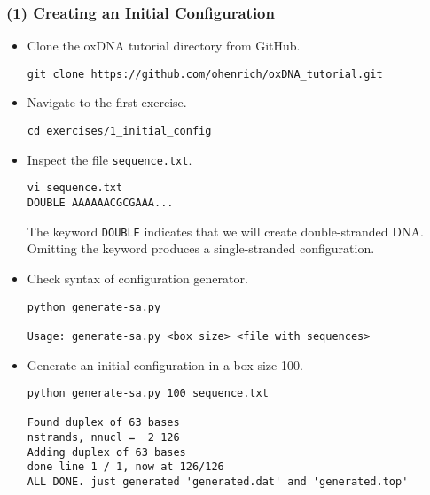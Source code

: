 \documentclass[slidestop,compress,9pt]{beamer}
\begin{document}
\begin{frame}[fragile]
\frametitle{(1) Creating an Initial Configuration}
\small

\begin{itemize}
\item Clone the oxDNA tutorial directory from GitHub.
\begin{lstlisting}
git clone https://github.com/ohenrich/oxDNA_tutorial.git 
\end{lstlisting}

\item Navigate to the first exercise.
\begin{lstlisting}
cd exercises/1_initial_config
\end{lstlisting}

\item Inspect the file \texttt{sequence.txt}.
\begin{lstlisting}
vi sequence.txt
DOUBLE AAAAAACGCGAAA...
\end{lstlisting}
The keyword \texttt{DOUBLE} indicates that we will create double-stranded DNA. Omitting the keyword produces a single-stranded configuration.

\item Check syntax of configuration generator.
\linespread{0.4}
\begin{lstlisting}
python generate-sa.py

Usage: generate-sa.py <box size> <file with sequences>
\end{lstlisting}

\item Generate an initial configuration in a box size 100.
\begin{lstlisting}
python generate-sa.py 100 sequence.txt

Found duplex of 63 bases
nstrands, nnucl =  2 126
Adding duplex of 63 bases
done line 1 / 1, now at 126/126
ALL DONE. just generated 'generated.dat' and 'generated.top'
\end{lstlisting}
\end{itemize}

\end{frame}
\end{document}
